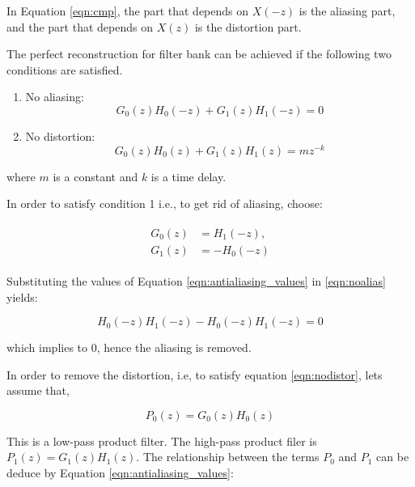 In Equation \ref{eqn:cmp}, the part that depends on $X(-z)$ is the aliasing part, and the part that depends on $X(z)$ is the distortion part.



The perfect reconstruction for filter bank can be achieved if the following two conditions are satisfied.

\begin{enumerate}
	\item No aliasing: 
	\begin{equation} \label{eqn:noalias}
	{G_{0}(z)H_{0}(-z) + G_{1}(z)H_{1}(-z) = 0}
	\end{equation}
	\item No distortion:
	\begin{equation} \label{eqn:nodistor}
	{G_{0}(z)H_{0}(z) + G_{1}(z)H_{1}(z) = mz^{-k}}
	\end{equation}
\end{enumerate}


where $m$ is a constant and $k$ is a time delay.

In order to satisfy condition 1 i.e., to get rid of aliasing, choose:

\begin{align}
	\label{eqn:antialiasing_values}
	\begin{split}
		G_0(z) &=  H_1(-z), \\ 
		G_1(z) &=  -H_0(-z)
	\end{split}
\end{align}

Substituting the values of Equation \ref{eqn:antialiasing_values} in  \ref{eqn:noalias} yields:

\begin{equation} \label{eqn:aliasrem}
{H_{0}(-z)H_1(-z)-H_0(-z)H_{1}(-z) = 0}
\end{equation}

which implies to 0, hence the aliasing is removed.

In order to remove the distortion, i.e, to satisfy equation \ref{eqn:nodistor}, lets assume that,

\begin{equation}\label{eqn:p0} 
{P_0(z)=G_{0}(z)H_{0}(z)}
\end{equation}

This is a low-pass product filter. The high-pass product filer is ${P_1(z)=G_{1}(z)H_{1}(z)}$. The relationship between the terms $P_0$ and $P_1$ can be deduce by Equation \ref{eqn:antialiasing_values}:

